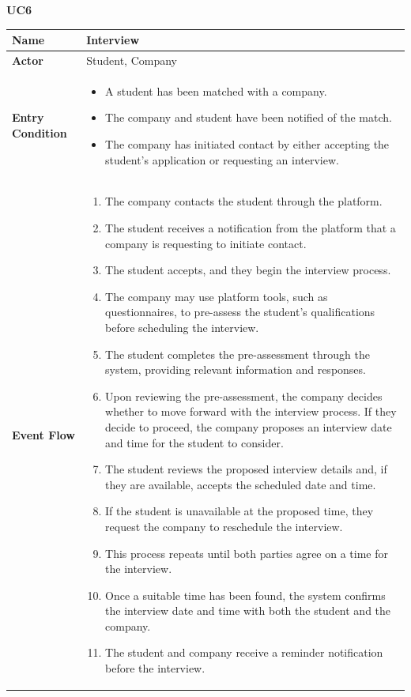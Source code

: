 \pagebreak
\textbf{UC6}

\begin{longtable}{|p{}|p{}|}
\hline
\textbf{Name} &  Interview\\
\hline
\textbf{Actor} &  Student, Company\\
\hline
\textbf{Entry Condition} &  
\begin{itemize}
    \item A student has been matched with a company.
    \item The company and student have been notified of the match.
    \item The company has initiated contact by either accepting the student's application or requesting an interview.
\end{itemize} 
\\
\hline
\textbf{Event Flow} &  
\begin{enumerate}
    \item The company contacts the student through the platform.
    \item The student receives a notification from the platform that a company is requesting to initiate contact.
    \item The student accepts, and they begin the interview process.
    \item The company may use platform tools, such as questionnaires, to pre-assess the student's qualifications before scheduling the interview.
    \item The student completes the pre-assessment through the system, providing relevant information and responses.
    \item Upon reviewing the pre-assessment, the company decides whether to move forward with the interview process. If they decide to proceed, the company proposes an interview date and time for the student to consider.
    \item The student reviews the proposed interview details and, if they are available, accepts the scheduled date and time.
    \item If the student is unavailable at the proposed time, they request the company to reschedule the interview.
    \item This process repeats until both parties agree on a time for the interview.
    \item Once a suitable time has been found, the system confirms the interview date and time with both the student and the company.
    \item The student and company receive a reminder notification before the interview.

\end{enumerate}
\end{longtable}
